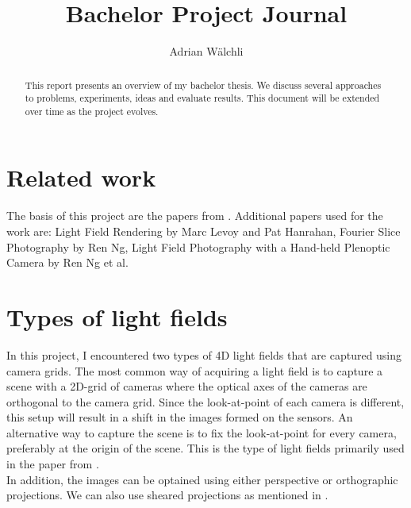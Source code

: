 \documentclass[11pt,a4paper,titlepage]{article}
\author{Adrian Wälchli}
\title{Bachelor Project Journal}
\begin{document}
\maketitle
\begin{abstract}
This report presents an overview of my bachelor thesis. We discuss several approaches to problems, experiments, ideas and evaluate results. This document will be extended over time as the project evolves.
\end{abstract}

\tableofcontents
\newpage

\section{Related work}
The basis of this project are the papers from \cite{WETZ_TOMO, WETZ_TENS}. Additional papers used for the work are: Light Field Rendering by Marc Levoy and Pat Hanrahan, Fourier Slice Photography by Ren Ng, Light Field Photography with a Hand-held Plenoptic Camera by Ren Ng et al. 

\section{Types of light fields} \label{sec:lftypes}
In this project, I encountered two types of 4D light fields that are captured using camera grids. The most common way of acquiring a light field is to capture a scene with a 2D-grid of cameras where the optical axes of the cameras are orthogonal to the camera grid. Since the look-at-point of each camera is different, this setup will result in a shift in the images formed on the sensors. An alternative way to capture the scene is to fix the look-at-point for every camera, preferably at the origin of the  scene. This is the type of light fields primarily used in the paper from \cite{WETZ_TOMO}. 
\\
In addition, the images can be optained using either perspective or orthographic projections. We can also use sheared projections as mentioned in \cite[p.~4]{LEVO_LFREN}.
\end{document}
